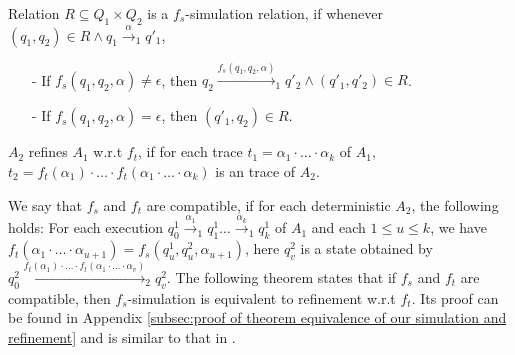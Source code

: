 
\begin{definition}[$f_s$-Simulation]
\label{definition:fs simulation}
Relation $R \subseteq Q_1 \times Q_2$ is a $f_s$-simulation relation, if whenever $(q_1,q_2) \in R \wedge q_1 {\xrightarrow{\alpha}}_1 q'_1$,
\begin{itemize}
\setlength{\itemsep}{0.5pt}
\item[-] If $f_s(q_1,q_2,\alpha) \neq \epsilon$, then $q_2 {\xrightarrow{f_s(q_1,q_2,\alpha)}}_1 q'_2 \wedge (q'_1,q'_2) \in R$.

\item[-] If $f_s(q_1,q_2,\alpha) = \epsilon$, then $(q'_1,q_2) \in R$.
\end{itemize}
\end{definition}


\begin{definition}[refinement w.r.t $f_t$]
\label{definition:ft refinement}
$A_2$ refines $A_1$ w.r.t $f_t$, if for each trace $t_1 = \alpha_1 \cdot \ldots \cdot \alpha_k$ of $A_1$, $t_2 = f_t(\alpha_1) \cdot \ldots \cdot f_t(\alpha_1 \cdot \ldots \cdot \alpha_k)$ is an trace of $A_2$.
\end{definition}



We say that $f_s$ and $f_t$ are compatible, if for each deterministic $A_2$, the following holds: For each execution %
$q_{0}^1 {\xrightarrow{\alpha_1}}_1 q_{1}^1 \ldots {\xrightarrow{\alpha_k}}_1 q_{k}^1$ of $A_1$ and each $1 \leq u \leq k$, we have $f_t(\alpha_1 \cdot \ldots \cdot \alpha_{u+1}) = f_s(q_{u}^1,q_{u}^2,\alpha_{u+1})$, here $q_v^2$ is a state obtained by
\mbox{$q_{0}^2 {\xrightarrow{f_t(\alpha_1) \cdot \ldots \cdot f_t(\alpha_1 \cdot \ldots \cdot \alpha_v) }}_2 q_v^2$}. %
The following theorem states that if $f_s$ and $f_t$ are compatible, then $f_s$-simulation is equivalent to refinement w.r.t $f_t$. Its proof can be found in Appendix \ref{subsec:proof of theorem equivalence of our simulation and refinement} and is similar to that in \cite{Abadi:1991,Lynch:1995}.


